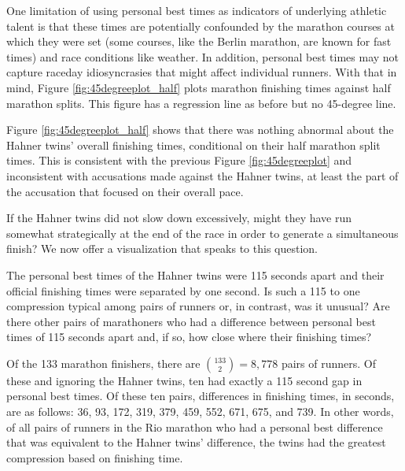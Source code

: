 \documentclass[12pt,titlepage]{article}
\begin{document}
One limitation of using personal best times as indicators of
underlying athletic talent is that these times are potentially
confounded by the marathon courses at which they were set (some
courses, like the Berlin marathon, are known for fast times) and race
conditions like weather.  In addition, personal best times may not
capture raceday idiosyncrasies that might affect individual runners.
With that in mind, Figure \ref{fig:45degreeplot_half} plots marathon
finishing times against half marathon splits.  This figure has a
regression line as before but no 45-degree line.

Figure \ref{fig:45degreeplot_half} shows that there was nothing
abnormal about the Hahner twins' overall finishing times, conditional
on their half marathon split times.  This is consistent with the
previous Figure \ref{fig:45degreeplot} and inconsistent with
accusations made against the Hahner twins, at least the part of the
accusation that focused on their  overall pace.

If the Hahner twins did not slow down excessively, might they have
run somewhat strategically at the end of the race in order to generate
a simultaneous finish?  We now offer a visualization that speaks to
this question.

The personal best times of the Hahner twins were 115 seconds apart and
their official finishing times were separated by one second.  Is such
a 115 to one compression typical among pairs of runners or, in
contrast, was it unusual?  Are there other pairs of marathoners who
had a difference between personal best times of 115 seconds apart and,
if so, how close where their finishing times?

Of the 133 marathon finishers, there are $\binom{133}{2} = 8,778$
pairs of runners.  Of these and ignoring the Hahner twins, ten had
exactly a 115 second gap in personal best times.  Of these ten pairs,
differences in finishing times, in seconds, are as follows: 36, 93, 172,
319, 379, 459, 552, 671, 675, and 739.  In other words, of all pairs
of runners in the Rio marathon who had a personal best difference that
was equivalent to the Hahner twins' difference, the twins had the
greatest compression based on finishing time.
\end{document}
